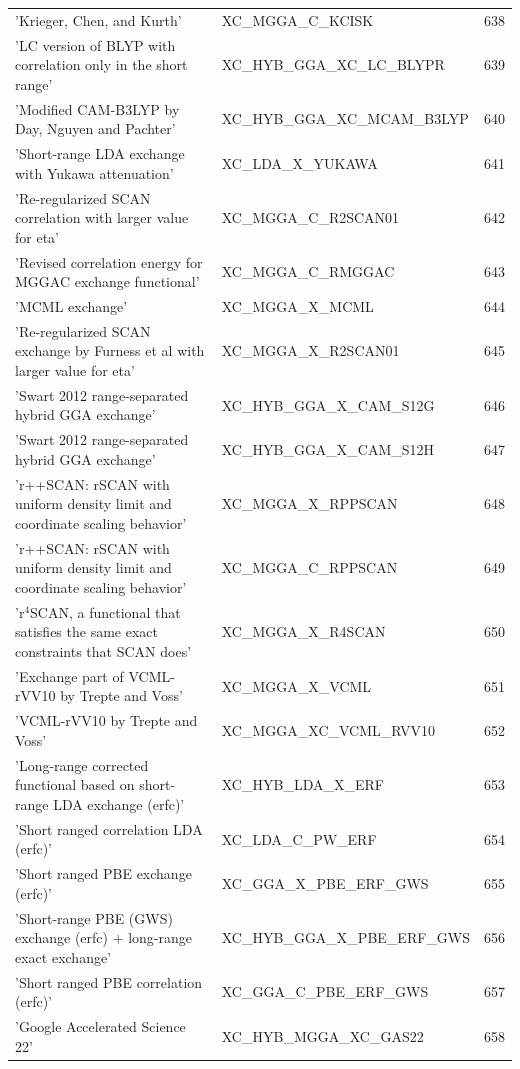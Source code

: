 \documentclass[final,12pt,makeidx,DIV=calc]{article}
\begin{document}
{{{{{{\begin{table}[!h]
\begin{center}
\begin{tabular}{llr}
  'Krieger, Chen, and Kurth' & XC\_MGGA\_C\_KCISK  &638\\
  'LC version of BLYP with correlation only in the short range' & XC\_HYB\_GGA\_XC\_LC\_BLYPR  &639\\
  'Modified CAM-B3LYP by Day, Nguyen and Pachter' & XC\_HYB\_GGA\_XC\_MCAM\_B3LYP  &640\\
  'Short-range LDA exchange with Yukawa attenuation' & XC\_LDA\_X\_YUKAWA  &641\\
  'Re-regularized SCAN correlation with larger value for eta' & XC\_MGGA\_C\_R2SCAN01  &642\\
  'Revised correlation energy for MGGAC exchange functional' & XC\_MGGA\_C\_RMGGAC  &643\\
  'MCML exchange' & XC\_MGGA\_X\_MCML  &644\\
  'Re-regularized SCAN exchange by Furness et al with larger value for eta' & XC\_MGGA\_X\_R2SCAN01  &645\\
  'Swart 2012 range-separated hybrid GGA exchange' & XC\_HYB\_GGA\_X\_CAM\_S12G  &646\\
  'Swart 2012 range-separated hybrid GGA exchange' & XC\_HYB\_GGA\_X\_CAM\_S12H  &647\\
  'r++SCAN: rSCAN with uniform density limit and coordinate scaling behavior' & XC\_MGGA\_X\_RPPSCAN  &648\\
  'r++SCAN: rSCAN with uniform density limit and coordinate scaling behavior' & XC\_MGGA\_C\_RPPSCAN  &649\\
  'r$^{4}$SCAN, a functional that satisfies the same exact constraints that SCAN does' & XC\_MGGA\_X\_R4SCAN  &650\\
  'Exchange part of VCML-rVV10 by Trepte and Voss' & XC\_MGGA\_X\_VCML  &651\\
  'VCML-rVV10 by Trepte and Voss' & XC\_MGGA\_XC\_VCML\_RVV10  &652\\
  'Long-range corrected functional based on short-range LDA exchange (erfc)' & XC\_HYB\_LDA\_X\_ERF  &653\\
  'Short ranged correlation LDA (erfc)' & XC\_LDA\_C\_PW\_ERF  &654\\
  'Short ranged PBE exchange (erfc)' & XC\_GGA\_X\_PBE\_ERF\_GWS  &655\\
  'Short-range PBE (GWS) exchange (erfc) + long-range exact exchange' & XC\_HYB\_GGA\_X\_PBE\_ERF\_GWS  &656\\
  'Short ranged PBE correlation (erfc)' & XC\_GGA\_C\_PBE\_ERF\_GWS  &657\\
  'Google Accelerated Science 22' & XC\_HYB\_MGGA\_XC\_GAS22  &658\\

\end{tabular}
\end{center}
\end{table}}}}}}}
\end{document}
